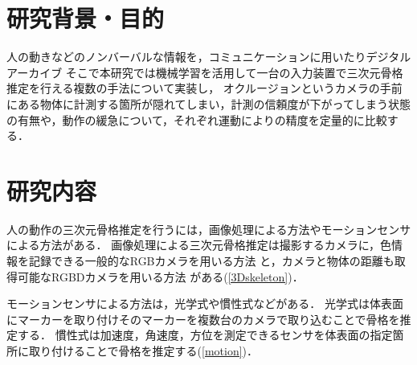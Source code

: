 \documentclass[titlepage]{jarticle}
\begin{document}
\maketitle

\section{研究背景・目的}
人の動きなどのノンバーバルな情報を，コミュニケーションに用いたりデジタルアーカイブ
そこで本研究では機械学習を活用して一台の入力装置で三次元骨格推定を行える複数の手法について実装し，
オクルージョンというカメラの手前にある物体に計測する箇所が隠れてしまい，計測の信頼度が下がってしまう状態の有無や，動作の緩急について，それぞれ運動によりの精度を定量的に比較する．
\section{研究内容}
%
人の動作の三次元骨格推定を行うには，画像処理による方法やモーションセンサによる方法がある．%
画像処理による三次元骨格推定は撮影するカメラに，色情報を記録できる一般的なRGBカメラを用いる方法
と，カメラと物体の距離も取得可能なRGBDカメラを用いる方法
がある(\ref{3Dskeleton})．

モーションセンサによる方法は，光学式や慣性式などがある．
光学式は体表面にマーカーを取り付けそのマーカーを複数台のカメラで取り込むことで骨格を推定する．
慣性式は加速度，角速度，方位を測定できるセンサを体表面の指定箇所に取り付けることで骨格を推定する(\ref{motion})．

\end{document}
